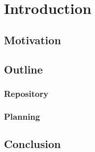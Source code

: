 \chapter{Introduction}
\label{introduction}

\lipsum[1]

\section{Motivation}

\lipsum[2]

\section{Outline}

\lipsum[2-5]

\subsection{Repository}

\lipsum[6-10]

\subsection{Planning}

\lipsum[10-14]

\section*{Conclusion}

\lipsum[15]

